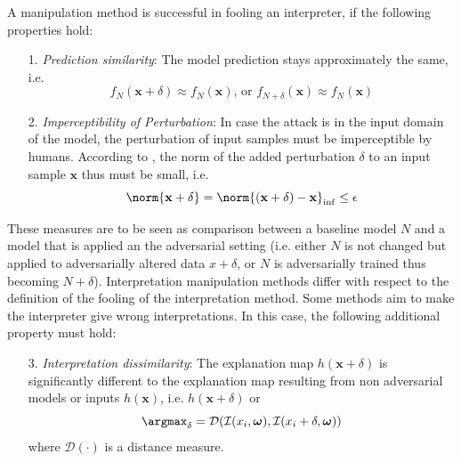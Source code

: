 A manipulation method is successful in fooling an interpreter, if the following properties hold: 
\begin{enumerate}
    \item[1.] \textit{Prediction similarity}: The model prediction stays approximately the same, i.e. $$f_N(\mathbf{x}+\delta) \approx f_N(\mathbf{x}) \text{, or } f_{N+\delta}(\mathbf{x}) \approx f_N(\mathbf{x})$$
    \item[2.] \textit{Imperceptibility of Perturbation}: In case the attack is in the input domain of the model, the perturbation of input samples must be imperceptible by humans. According to \cite{dombrowski2019explanations}, the norm of the added perturbation $\delta$ to an input sample $\mathbf{x}$ thus must be small, i.e. $$\norm{\mathbf{x}+\delta} = \norm{(\mathbf{x}+\delta)-\mathbf{x}}_{\inf} \leq \epsilon$$ %
\end{enumerate}
\setlength{\leftskip}{0cm}

These measures are to be seen as comparison between a baseline model $N$ and a model that is applied an the adversarial setting (i.e. either $N$ is not changed but applied to adversarially altered data $x+\delta$, or $N$ is adversarially trained thus becoming $N+\delta$). 
Interpretation manipulation methods differ with respect to the definition of the fooling of the interpretation method. 
Some methods aim to make the interpreter give wrong interpretations\cite{fooling_nn_interpreters}. 
In this case, the following additional property must hold: 
\begin{enumerate}
   \item[3.] \textit{Interpretation dissimilarity}: The explanation map $h(\mathbf{x}+\delta)$ is significantly different to the explanation map resulting from non adversarial models or inputs $h(\mathbf{x})$, i.e. $h(\mathbf{x}+\delta)$ or $$\argmax_{\delta} = \mathcal{D}(\mathcal{I}(x_i, \boldsymbol{\omega}), \mathcal{I}(x_i+\delta, \boldsymbol{\omega}))$$ where $\mathcal{D}(\cdot)$ is a distance measure. 
\end{enumerate}

